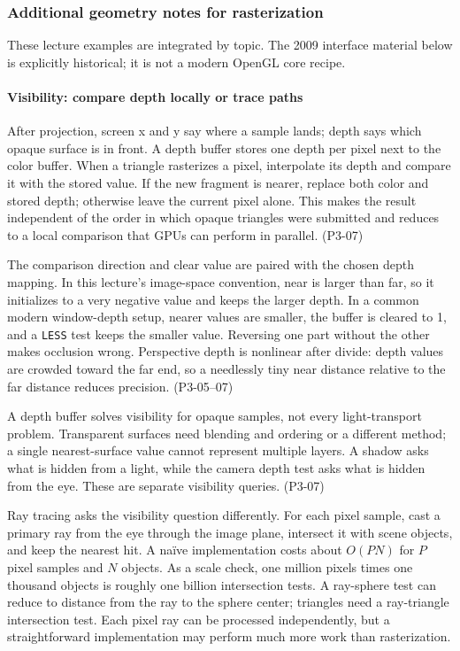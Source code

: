 \subsubsection{Additional geometry notes for rasterization}\label{additional-geometry-notes-for-rasterization}

These lecture examples are integrated by topic. The 2009 interface material below is explicitly historical; it is not a modern OpenGL core recipe.

\paragraph{Visibility: compare depth locally or trace paths}\label{visibility-compare-depth-locally-or-trace-paths}

After projection, screen x and y say where a sample lands; depth says which opaque surface is in front. A depth buffer stores one depth per pixel next to the color buffer. When a triangle rasterizes a pixel, interpolate its depth and compare it with the stored value. If the new fragment is nearer, replace both color and stored depth; otherwise leave the current pixel alone. This makes the result independent of the order in which opaque triangles were submitted and reduces to a local comparison that GPUs can perform in parallel. (P3-07)

The comparison direction and clear value are paired with the chosen depth mapping. In this lecture's image-space convention, near is larger than far, so it initializes to a very negative value and keeps the larger depth. In a common modern window-depth setup, nearer values are smaller, the buffer is cleared to 1, and a \texttt{LESS} test keeps the smaller value. Reversing one part without the other makes occlusion wrong. Perspective depth is nonlinear after divide: depth values are crowded toward the far end, so a needlessly tiny near distance relative to the far distance reduces precision. (P3-05--07)

A depth buffer solves visibility for opaque samples, not every light-transport problem. Transparent surfaces need blending and ordering or a different method; a single nearest-surface value cannot represent multiple layers. A shadow asks what is hidden from a light, while the camera depth test asks what is hidden from the eye. These are separate visibility queries. (P3-07)

Ray tracing asks the visibility question differently. For each pixel sample, cast a primary ray from the eye through the image plane, intersect it with scene objects, and keep the nearest hit. A naïve implementation costs about \(O(PN)\) for \(P\) pixel samples and \(N\) objects. As a scale check, one million pixels times one thousand objects is roughly one billion intersection tests. A ray-sphere test can reduce to distance from the ray to the sphere center; triangles need a ray-triangle intersection test. Each pixel ray can be processed independently, but a straightforward implementation may perform much more work than rasterization.

